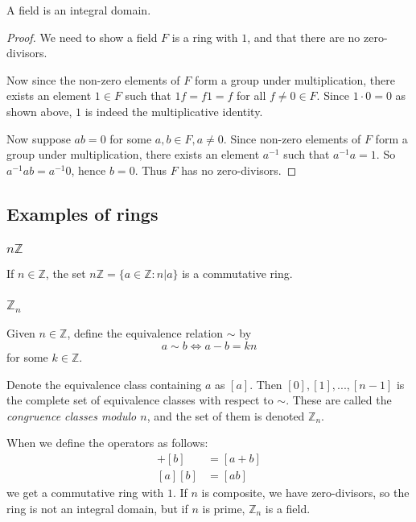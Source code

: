  \begin{Lemma}
    A field is an integral domain.
  \end{Lemma}

  \begin{proof}
    We need to show a field $F$ is a ring with $1$, and that there are no zero-divisors.

    Now since the non-zero elements of $F$ form a group under multiplication,
    there exists an element $1 \in F$ such that $1f = f1 = f$ for all $f \neq 0 \in F$.
    Since $1 \cdot 0 = 0$ as shown above, $1$ is indeed the multiplicative identity.

    Now suppose $ab = 0$ for some $a, b \in F, a \neq 0$. Since non-zero elements of $F$
    form a group under multiplication, there exists an element $a^{-1}$ such that
    $a^{-1}a = 1$. So $a^{-1}ab = a^{-1}0$, hence $b = 0$. Thus $F$ has no zero-divisors.
  \end{proof}

  \subsection{Examples of rings}

  \subsubsection{$n\mathbb{Z}$}
  If $n \in \mathbb{Z}$, the set $n\mathbb{Z} = \lbrace a \in \mathbb{Z} : n | a \rbrace$
  is a commutative ring.

  \subsubsection{$\mathbb{Z}_{n}$}
  Given $n \in \mathbb{Z}$, define the equivalence relation $\sim$ by
  \[
    a \sim b \iff a - b = kn
  \]
  for some $k \in \mathbb{Z}$.

  Denote the equivalence class containing $a$ as $[a]$.
  Then $[0], [1], ..., [n-1]$ is the complete set of equivalence classes with respect
  to $\sim$. These are called the \emph{congruence classes modulo $n$}, and the set of
  them is denoted $\mathbb{Z}_{n}$.

  When we define the operators as follows:
  \begin{align*}
    [a] + [b] &= [a + b]\\
    [a][b] &= [ab]
  \end{align*}
  we get a commutative ring with $1$. If $n$ is composite, we have zero-divisors, so
  the ring is not an integral domain, but if $n$ is prime, $\mathbb{Z}_{n}$ is a field.

